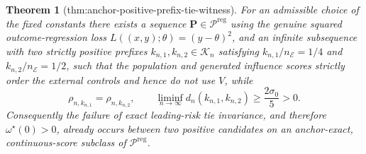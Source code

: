 \documentclass{article}
\newtheorem{theorem}{Theorem}
\begin{document}
\begin{theorem}[thm:anchor-positive-prefix-tie-witness]\label{thm:anchor-positive-prefix-tie-witness}
For an admissible choice of the fixed constants there exists a sequence \(\mathbf P\in\mathcal P^{\mathrm{reg}}\) using the genuine squared outcome-regression loss \(L((x,y);\theta)=(y-\theta)^2\), and an infinite subsequence with two strictly positive prefixes \(k_{n,1},k_{n,2}\in\mathcal K_n\) satisfying \(k_{n,1}/n_{\mathcal E}=1/4\) and \(k_{n,2}/n_{\mathcal E}=1/2\), such that the population and generated influence scores strictly order the external controls and hence do not use \(V\), while
\[
 \rho_{n,k_{n,1}}=\rho_{n,k_{n,2}},
 \qquad
 \liminf_{n\to\infty}d_n(k_{n,1},k_{n,2})\geq\frac{2\sigma_0}{5}>0.
\]
Consequently the failure of exact leading-risk tie invariance, and therefore \(\omega^{\star}(0)>0\), already occurs between two positive candidates on an anchor-exact, continuous-score subclass of \(\mathcal P^{\mathrm{reg}}\).
\end{theorem}
\end{document}
